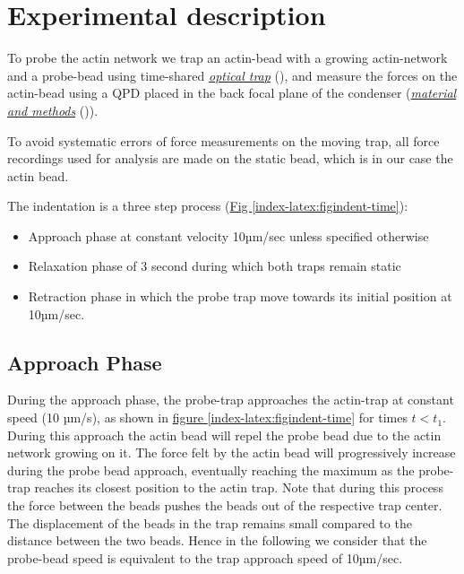 \documentclass[A4paperpaper,11pt,english]{sphinxmanual}
\begin{document}
\section{Experimental description}
\label{index-latex:experimental-description}
To probe the actin network we trap an actin-bead with a growing actin-network
and a probe-bead using time-shared {\hyperref[index-latex:time-shared-ot]{\emph{optical trap}}} (),  and
measure the forces on the actin-bead using a QPD placed in the back focal plane of
the condenser ({\hyperref[index-latex:m-et-m]{\emph{material and methods}}} ()).

To avoid systematic errors of force measurements on the moving trap, all force
recordings used for analysis are made on the static bead, which is in our case the actin bead.

The indentation is a three step process (\hyperref[index-latex:figindent-time]{Fig  \ref*{index-latex:figindent-time}}):
\begin{itemize}
\item {} 
Approach phase at constant velocity 10µm/sec unless specified otherwise

\item {} 
Relaxation phase of 3 second during which both traps remain static

\item {} 
Retraction phase in which the probe trap move towards its initial position at 10µm/sec.

\end{itemize}


\subsection{Approach Phase}
\label{index-latex:approach-phase}
During the approach phase, the probe-trap approaches the actin-trap at constant speed (10 µm/s), as shown in
\hyperref[index-latex:figindent-time]{figure  \ref*{index-latex:figindent-time}} for times \(t < t_1\). During this approach the actin bead
will repel the probe bead due to the actin network growing on it. The force felt
by the actin bead will progressively increase during the probe bead approach,
eventually reaching the maximum as the probe-trap reaches its closest position
to the actin trap. Note that during this process
the force between the beads pushes  the beads out of the respective trap center.
The displacement of the beads in the trap remains small compared to the
distance between the two beads. Hence in the following we consider that the probe-bead speed is equivalent to the trap approach speed of 10µm/sec.
\end{document}
